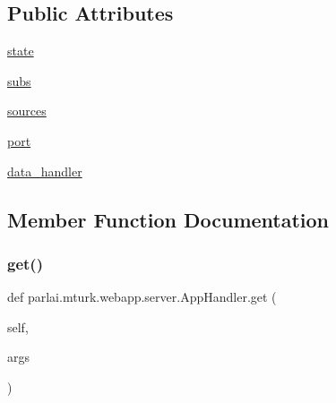 \subsection*{Public Attributes}
\begin{DoxyCompactItemize}
\item 
\hyperlink{classparlai_1_1mturk_1_1webapp_1_1server_1_1AppHandler_a7193d2e1fc8447f00be8ab6374e43f32}{state}
\item 
\hyperlink{classparlai_1_1mturk_1_1webapp_1_1server_1_1AppHandler_a1c61eec19a28f77d438777da6e034cbc}{subs}
\item 
\hyperlink{classparlai_1_1mturk_1_1webapp_1_1server_1_1AppHandler_ae517a50ac0cfc7b33a5aafdc2984c71a}{sources}
\item 
\hyperlink{classparlai_1_1mturk_1_1webapp_1_1server_1_1AppHandler_a211ede0441daaf339d7b12bf119b5858}{port}
\item 
\hyperlink{classparlai_1_1mturk_1_1webapp_1_1server_1_1AppHandler_ac635a7095f1cf851b4b33cca5d6d081b}{data\+\_\+handler}
\end{DoxyCompactItemize}


\subsection{Member Function Documentation}
\mbox{\label{classparlai_1_1mturk_1_1webapp_1_1server_1_1AppHandler_a67f91de7041df784c72e37757e346a94}} 
\subsubsection{\texorpdfstring{get()}{get()}}
{\footnotesize\ttfamily def parlai.\+mturk.\+webapp.\+server.\+App\+Handler.\+get (\begin{DoxyParamCaption}\item[{}]{self,  }\item[{}]{args }\end{DoxyParamCaption})}

\mbox{\label{classparlai_1_1mturk_1_1webapp_1_1server_1_1AppHandler_aeebc2d7f949d09ad85a9f93bb9058857}} 
